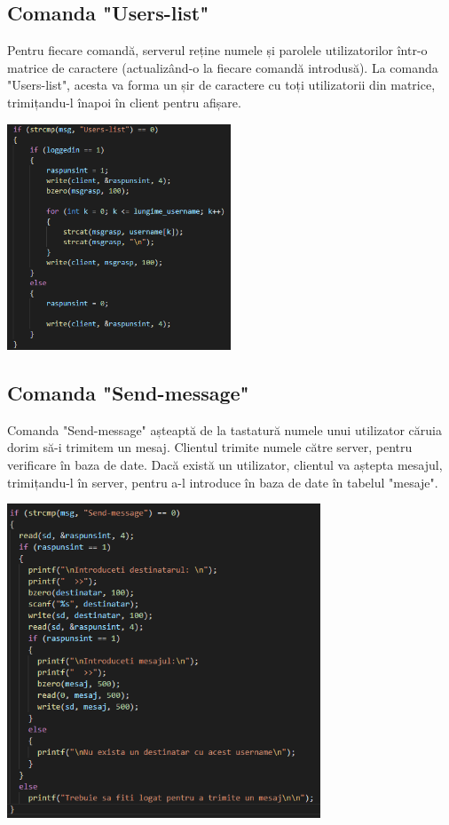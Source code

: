 \documentclass[a4paper,12pt]{article}
\begin{document}
\subsection{Comanda "Users-list"}

\tab
Pentru fiecare comandă, serverul reține numele și parolele utilizatorilor într-o matrice de caractere (actualizând-o la fiecare comandă introdusă). La comanda "Users-list", acesta va forma un șir de caractere cu toți utilizatorii din matrice, trimițandu-l înapoi în client pentru afișare. 

\bigskip
\bigskip
\bigskip

\begin{center}
\includegraphics[width=0.5\textwidth]{Users-list.png}
\end{center}

\bigskip
\bigskip
\bigskip

\subsection{Comanda "Send-message"}

\tab
Comanda "Send-message" așteaptă de la tastatură numele unui utilizator căruia dorim să-i trimitem un mesaj. Clientul trimite numele către server, pentru verificare în baza de date. Dacă există un utilizator, clientul va aștepta mesajul, trimițandu-l în server, pentru a-l introduce în baza de date în tabelul "mesaje".

\bigskip
\bigskip
\bigskip

\begin{center}
\includegraphics[width=0.7\textwidth]{Send-message.png}
\end{center}
\end{document}
